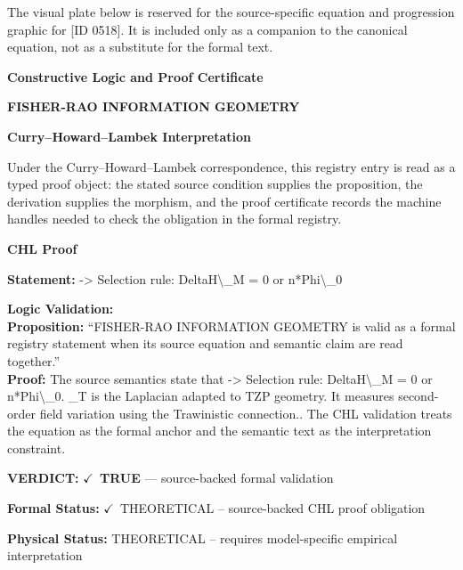 \begingroup\footnotesize\sloppy
The visual plate below is reserved for the source-specific equation and progression graphic for [ID 0518]. It is included only as a companion to the canonical equation, not as a substitute for the formal text.
\par\endgroup
\ifTZPDarkEdition
{}
\fi

\clearpage
\begingroup\tzpsupportsetup
\noindent\textbf{\fontsize{10.8pt}{12.8pt}\selectfont [ID 0518] Constructive Logic and Proof Certificate}\par
\noindent\textbf{\fontsize{10pt}{12pt}\selectfont FISHER-RAO INFORMATION GEOMETRY}\par
\vspace{0.45em}
\begingroup
\footnotesize
\setlength{\parskip}{0.22em}
\setlength{\parindent}{0pt}
\noindent\textbf{Curry--Howard--Lambek Interpretation}\par
Under the Curry--Howard--Lambek correspondence, this registry entry is read as a typed proof
object: the stated source condition supplies the proposition, the derivation supplies the
morphism, and the proof certificate records the machine handles needed to check the obligation
in the formal registry.

\vspace{0.45em}
\noindent\textbf{CHL Proof}\par
\textbf{Statement:} -> Selection rule: DeltaH\textbackslash{}\_M = 0 or n*Phi\textbackslash{}\_0

\textbf{Logic Validation:}\\
\textbf{Proposition:} ``FISHER-RAO INFORMATION GEOMETRY is valid as a formal registry statement when its source
equation and semantic claim are read together.''\\
\textbf{Proof:} The source semantics state that -> Selection rule: DeltaH\textbackslash{}\_M = 0 or n*Phi\textbackslash{}\_0. \_T is
the Laplacian adapted to TZP geometry. It measures second-order field variation using
the Trawinistic connection.. The CHL validation treats the equation as the formal anchor
and the semantic text as the interpretation constraint.

\textbf{VERDICT:} \ensuremath{\checkmark}\ \textbf{TRUE} --- source-backed formal validation

\textbf{Formal Status:} \ensuremath{\checkmark}\ THEORETICAL -- source-backed CHL proof obligation

\textbf{Physical Status:} THEORETICAL -- requires model-specific empirical interpretation
\par\vspace{0.45em}
\par
\ifTZPDarkEdition
{}
\fi
\endgroup
\endgroup
